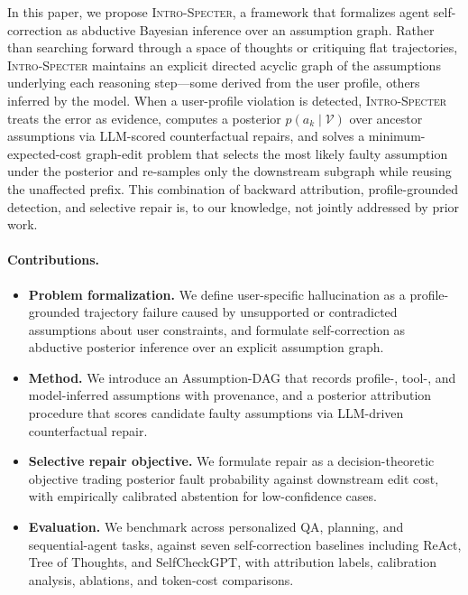 In this paper, we propose \textsc{Intro-Specter}, a framework that formalizes
agent self-correction as abductive Bayesian inference over an assumption graph.
Rather than searching forward through a space of thoughts or critiquing flat
trajectories, \textsc{Intro-Specter} maintains an explicit directed acyclic
graph of the assumptions underlying each reasoning step---some derived from the
user profile, others inferred by the model. When a user-profile violation is
detected, \textsc{Intro-Specter} treats the error as evidence, computes a
posterior $p(a_k \mid \mathcal{V})$ over ancestor assumptions via LLM-scored
counterfactual repairs, and solves a minimum-expected-cost graph-edit problem
that selects the most likely faulty assumption under the posterior and
re-samples only the downstream subgraph while reusing the unaffected prefix.
This combination of backward attribution, profile-grounded detection, and
selective repair is, to our knowledge, not jointly addressed by prior work.

\paragraph{Contributions.}
\begin{itemize}[leftmargin=*,itemsep=2pt,topsep=2pt]
\item \textbf{Problem formalization.} We define user-specific hallucination as
a profile-grounded trajectory failure caused by unsupported or contradicted
assumptions about user constraints, and formulate self-correction as abductive
posterior inference over an explicit assumption graph.
\item \textbf{Method.} We introduce an Assumption-DAG that records profile-,
tool-, and model-inferred assumptions with provenance, and a posterior
attribution procedure that scores candidate faulty assumptions via LLM-driven
counterfactual repair.
\item \textbf{Selective repair objective.} We formulate repair as a
decision-theoretic objective trading posterior fault probability against
downstream edit cost, with empirically calibrated abstention for
low-confidence cases.
\item \textbf{Evaluation.} We benchmark across personalized QA, planning,
and sequential-agent tasks, against seven self-correction baselines including
ReAct, Tree of Thoughts, and SelfCheckGPT, with attribution labels,
calibration analysis, ablations, and token-cost comparisons.
\end{itemize}

